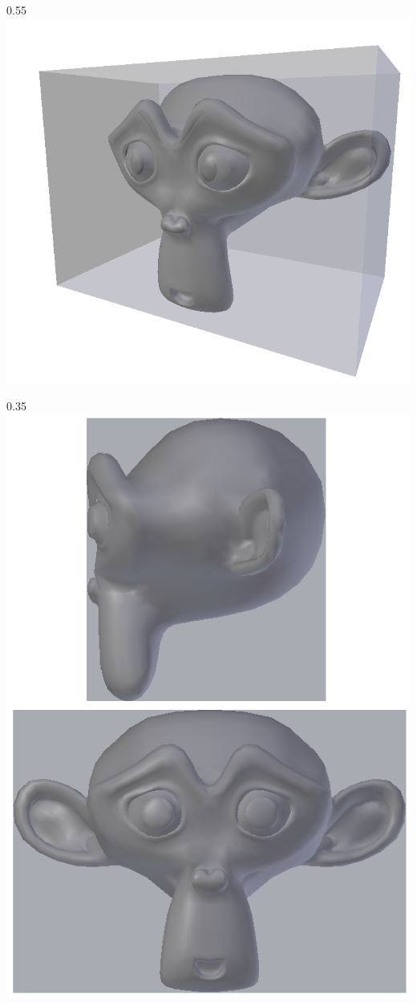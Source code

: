 \begin{figureth}
	\begin{subfigureth}{0.55\textwidth}
		\includegraphics[width=\linewidth]{images/boiteenglobante}
		\label{boiteenglobante}
	\end{subfigureth}
	\qquad
	\begin{subfigureth}{0.35\textwidth}
		\includegraphics[width=\linewidth]{images/boiteenglobante2}

\end{subfigureth}
\end{figureth}
